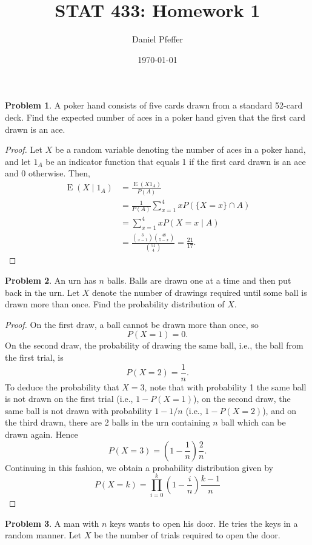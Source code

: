 \documentclass[oneside,reqno]{amsart}
\title{STAT 433: Homework 1}
\author{Daniel Pfeffer}
\date{\today}
\DeclareMathOperator{\E}{\mathrm{E}}
\theoremstyle{definition}
\newtheorem{prob}{Problem}
\begin{document}
\maketitle


\begin{prob}
A poker hand consists of five cards drawn from a standard 52-card deck. Find the expected number of aces in a poker hand given that the first card drawn is an ace.
\end{prob}


\begin{proof}
Let $X$ be a random variable denoting the number of aces in a poker hand, and let $1_A$ be an indicator function that equals 1 if the first card drawn is an ace and 0 otherwise. Then, 
\begin{align*}
	\E(X \mid 1_A) &= \frac{\E(X 1_A)}{P(A)} \\
	&= \frac{1}{P(A)} \sum_{x=1}^4 x P(\{X = x\} \cap A) \\
	&= \sum_{x=1}^4 x P(X = x \mid A) \\
	&= \frac{\binom{3}{x-1} \binom{48}{5-x}}{\binom{51}{4}}= \frac{21}{17}.
\end{align*}
\end{proof}


\begin{prob}
An urn has $n$ balls. Balls are drawn one at a time and then put back in the urn. Let $X$ denote the number of drawings required until some ball is drawn more than once. Find the probability distribution of $X$.
\end{prob}

\begin{proof}
On the first draw, a ball cannot be drawn more than once, so
\[
	P(X=1) = 0.
\]
On the second draw, the probability of drawing the same ball, i.e., the ball from the first trial, is
\[
	P(X=2) = \frac{1}{n}.
\]
To deduce the probability that $X=3$, note that with probability 1 the same ball is not drawn on the first trial (i.e., $1-P(X=1)$), on the second draw, the same ball is not drawn with probability $1-1/n$ (i.e., $1-P(X=2)$), and on the third drawn, there are 2 balls in the urn containing $n$ ball which can be drawn again. Hence
\[
	P(X=3) =\left(1 - \frac{1}{n}\right) \frac{2}{n}.
\]
Continuing in this fashion, we obtain a probability distribution given by
\[
	P(X=k) = \prod_{i=0}^k \left(1-\frac{i}{n}\right) \frac{k-1}{n}
\]
\end{proof}


\begin{prob}
A man with $n$ keys wants to open his door. He tries the keys in a random manner. Let $X$ be the number of trials required to open the door. 
\end{prob}
\end{document}
